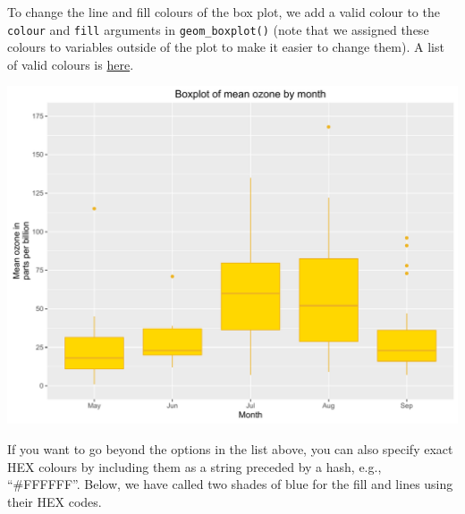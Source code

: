 To change the line and fill colours of the box plot, we add a valid
colour to the \texttt{colour} and \texttt{fill} arguments in
\texttt{geom\_boxplot()} (note that we assigned these colours to
variables outside of the plot to make it easier to change them). A list
of valid colours is
\href{http://www.stat.columbia.edu/~tzheng/files/Rcolor.pdf}{here}.

\begin{Shaded}
\begin{Highlighting}[]

\StringTok{ }\NormalTok{(}  \StringTok{ }
\StringTok{       }\NormalTok{(}  
\StringTok{       }\NormalTok{(} \NormalTok{,}
\StringTok{         } \NormalTok{(}\NormalTok{, }\NormalTok{, }\NormalTok{),} \NormalTok{(}\NormalTok{, }\NormalTok{)) +}
\StringTok{       }\NormalTok{(} \NormalTok{) +}
\StringTok{       }\NormalTok{(}\NormalTok{)}
\end{Highlighting}
\end{Shaded}

\begin{center}\includegraphics[width=0.55\linewidth]{figures/box_6-1} \end{center}

If you want to go beyond the options in the list above, you can also
specify exact HEX colours by including them as a string preceded by a
hash, e.g., ``\#FFFFFF''. Below, we have called two shades of blue for
the fill and lines using their HEX codes.

